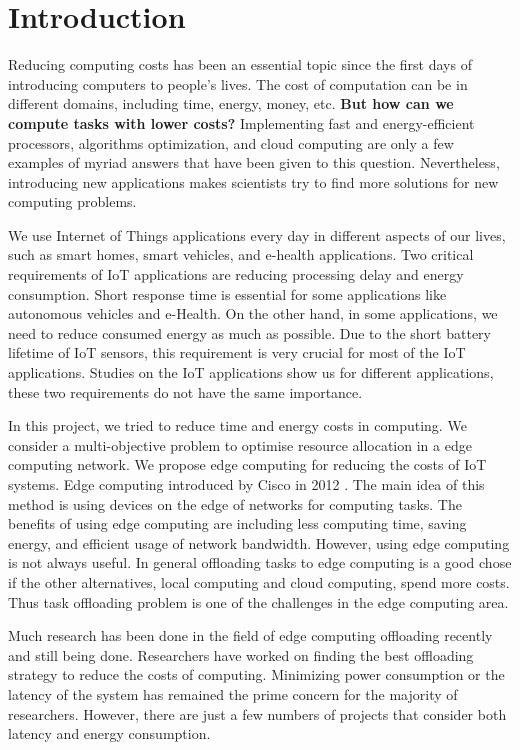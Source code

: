\documentclass[12pt,final,3p]{CSP}
\begin{document}
\section{Introduction}
\label{}
\noindent
Reducing computing costs has been an essential topic since the first days of introducing computers to people's lives. The cost of computation can be in different domains, including time, energy, money, etc. \textbf{But how can we compute tasks with lower costs? } Implementing fast and energy-efficient processors, algorithms optimization, and cloud computing are only a few examples of myriad answers that have been given to this question.  Nevertheless, introducing new applications makes scientists try to find more solutions for new computing problems.

We use Internet of Things applications every day in different aspects of our lives, such as smart homes, smart vehicles, and e-health applications. Two critical requirements of IoT applications are reducing processing delay and energy consumption. Short response time is essential for some applications like autonomous vehicles and e-Health. On the other hand, in some applications, we need to reduce consumed energy as much as possible. Due to the short battery lifetime of IoT sensors, this requirement is very crucial for most of the IoT applications. Studies on the IoT applications show us for different applications, these two requirements do not have the same importance.

In this project, we tried to reduce time and energy costs in computing. We consider a multi-objective problem to optimise resource allocation in a edge computing network. We propose edge computing for reducing the costs of IoT systems. Edge computing introduced by Cisco in 2012 \cite{Bonomi:2012:FCR:2342509.2342513}. The main idea of this method is using devices on the edge of networks for computing tasks. The benefits of using edge computing are including less computing time, saving energy, and efficient usage of network bandwidth. However, using edge computing is not always useful. In general offloading tasks to edge computing is a good chose if the other alternatives, local computing and cloud computing, spend more costs. Thus task offloading problem is one of the challenges in the edge computing area. 

Much research has been done in the field of edge computing offloading recently and still being done. Researchers have worked on finding the best offloading strategy to reduce the costs of computing. Minimizing power consumption or the latency of the system has remained the prime concern for the majority of researchers. However, there are just a few numbers of projects that consider both latency and energy consumption.
\end{document}
